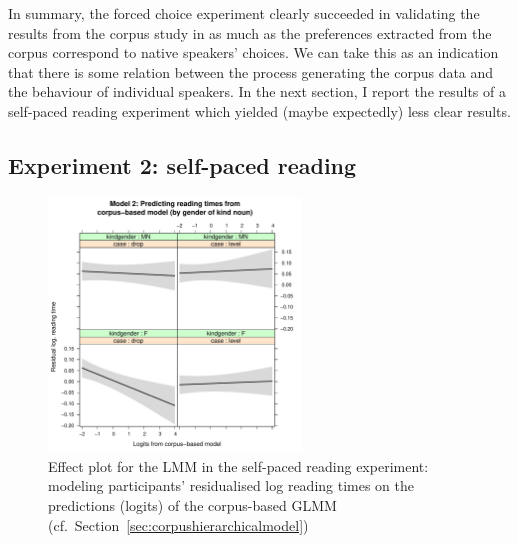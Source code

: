 \documentclass[USenglish]{article}
\begin{document}
In summary, the forced choice experiment clearly succeeded in validating the results from the corpus study in as much as the preferences extracted from the corpus correspond to native speakers' choices.
We can take this as an indication that there is some relation between the process generating the corpus data and the behaviour of individual speakers.
In the next section, I report the results of a self-paced reading experiment which yielded (maybe expectedly) less clear results.




\subsection{Experiment 2: self-paced reading}


\begin{figure}[h]
\centering
\includegraphics[width=0.6\textwidth]{figures/experiment/spr_effects_case+modelPred+gender}
\caption{Effect plot for the LMM in the self-paced reading experiment: modeling participants' residualised log reading times on the predictions (logits) of the corpus-based GLMM (cf.\ Section~\ref{sec:corpushierarchicalmodel})}
\label{fig:spr:continuous:effects}
\end{figure}
\end{document}
